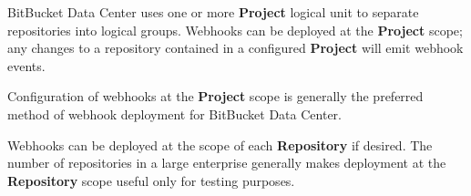 BitBucket Data Center uses one or more \textbf{Project} logical unit to separate repositories
into logical groups.  Webhooks can be deployed at the \textbf{Project} scope; any changes
to a repository contained in a configured \textbf{Project} will emit webhook events.

Configuration of webhooks at the \textbf{Project} scope is generally the preferred
method of webhook deployment for BitBucket Data Center.

Webhooks can be deployed at the scope of each \textbf{Repository} if desired.  The number of repositories
in a large enterprise generally makes deployment at the \textbf{Repository} scope useful
only for testing purposes.
